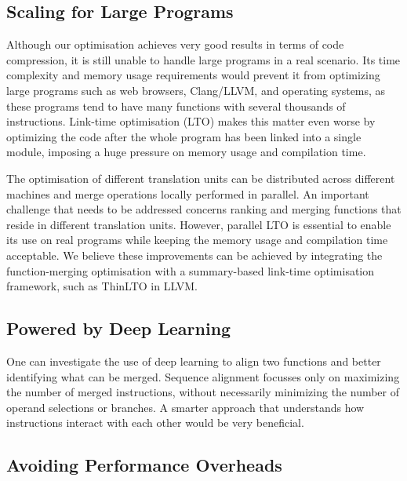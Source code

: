 \subsection{Scaling for Large Programs}

Although our optimisation achieves very good results in terms of code compression, it is still unable to handle large programs in a real scenario.
Its time complexity and memory usage requirements would prevent it from optimizing large programs such as web browsers, Clang/LLVM, and operating systems, as these programs tend to have many functions with several thousands of instructions.
Link-time optimisation (LTO) makes this matter even worse by optimizing the code after the whole program has been linked into a single module, imposing a huge pressure on memory usage and compilation time.

The optimisation of different translation units can be distributed across different machines and merge operations locally performed in parallel.
An important challenge that needs to be addressed concerns ranking and merging functions that reside in different translation units.
However, parallel LTO is essential to enable its use on real programs while keeping the memory usage and compilation time acceptable.
We believe these improvements can be achieved by integrating the function-merging optimisation with a summary-based  link-time optimisation framework, such as ThinLTO in LLVM. 

\subsection{Powered by Deep Learning}

One can investigate the use of deep learning to align two functions and better identifying what can be merged.
Sequence alignment focusses only on maximizing the number of merged instructions,
without necessarily minimizing the number of operand selections or branches.
A smarter approach that understands how instructions interact with each other would be
very beneficial.

\subsection{Avoiding Performance Overheads}

